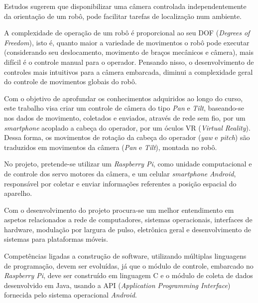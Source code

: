 Estudos sugerem que disponibilizar uma câmera controlada independentemente da orientação de um robô, pode facilitar tarefas de localização num ambiente. 

A complexidade de operação de um robô é proporcional ao seu DOF (\textit{Degrees of Freedom}), isto é, quanto maior a variedade de movimentos o robô pode executar (considerando seu deslocamento, movimento de braços mecânicos e câmera), mais difícil é o controle manual para o operador.
Pensando nisso, o desenvolvimento de controles mais intuitivos para a câmera embarcada, diminui a complexidade geral do controle de movimentos globais do robô. \par

Com o objetivo de aprofundar os conhecimentos adquiridos ao longo do curso, este trabalho visa criar um controle de câmera do tipo \textit{Pan} e \textit{Tilt}, baseando-se nos dados de movimento, coletados e enviados, através de rede sem fio, por um \textit{smartphone} acoplado a cabeça do operador, por um óculos VR (\textit{Virtual Reality}). Dessa forma, os movimentos de rotação da cabeça do operador (\textit{yaw} e \textit{pitch}) são traduzidos em movimentos da câmera (\textit{Pan} e \textit{Tilt}), montada no robô. \par 

No projeto, pretende-se utilizar um \textit{Raspberry Pi}, como unidade computacional e de controle dos servo motores da câmera, e um celular \textit{smartphone} \textit{Android}, responsável por coletar e enviar informações referentes a posição espacial do aparelho. \par

Com o desenvolvimento do projeto procura-se um melhor entendimento em aspetos relacionados a rede de computadores, sistemas operacionais, interfaces de hardware, modulação por largura de pulso, eletrônica geral e desenvolvimento de sistemas para plataformas móveis.\par

Competências ligadas a construção de software, utilizando múltiplas linguagens de programação, devem ser evoluídas, já que o módulo de controle, embarcado no \textit{Raspberry Pi}, deve ser construído em linguagem C e o módulo de coleta de dados desenvolvido em Java, usando a API (\textit{Application Programming Interface}) fornecida pelo sistema operacional \textit{Android}.\par

